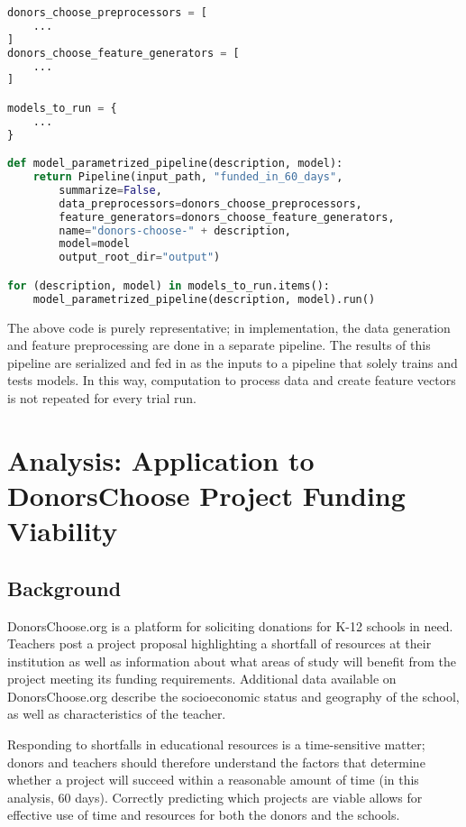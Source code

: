 \documentclass[11pt]{article}
\begin{document}
\begin{lstlisting}[language=Python,numbers=none]
donors_choose_preprocessors = [
    ...
]
donors_choose_feature_generators = [
    ...
]

models_to_run = { 
    ...
}

def model_parametrized_pipeline(description, model):
    return Pipeline(input_path, "funded_in_60_days",
        summarize=False,
        data_preprocessors=donors_choose_preprocessors,
        feature_generators=donors_choose_feature_generators,
        name="donors-choose-" + description,
        model=model
        output_root_dir="output")

for (description, model) in models_to_run.items():
    model_parametrized_pipeline(description, model).run()
\end{lstlisting}

The above code is purely representative; in implementation, the data generation and feature preprocessing are done in a separate pipeline. The results of this pipeline are serialized and fed in as the inputs to a pipeline that solely trains and tests models. In this way, computation to process data and create feature vectors is not repeated for every trial run.


\section{Analysis: Application to DonorsChoose Project Funding Viability}

\subsection{Background}
DonorsChoose.org is a platform for soliciting donations for K-12 schools in need. Teachers post a project proposal highlighting a shortfall of resources at their institution as well as information about what areas of study will benefit from the project meeting its funding requirements. Additional data available on DonorsChoose.org describe the socioeconomic status and geography of the school, as well as characteristics of the teacher. 

Responding to shortfalls in educational resources is a time-sensitive matter; donors and teachers should therefore understand the factors that determine whether a project will succeed within a reasonable amount of time (in this analysis, 60 days). Correctly predicting which projects are viable allows for effective use of time and resources for both the donors and the schools. 
\end{document}
